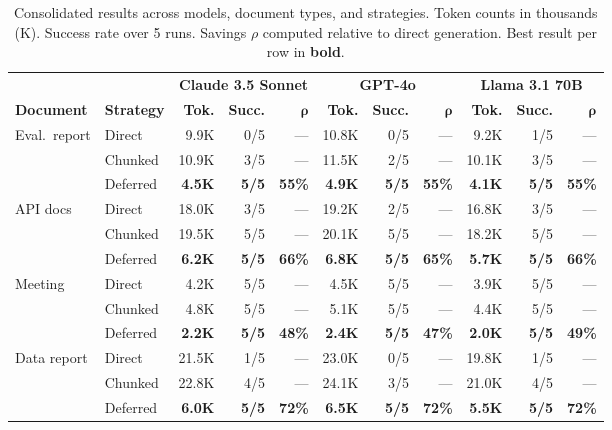 \documentclass[11pt,twocolumn]{article}
\begin{document}
\begin{table}[t]
\centering
\caption{Consolidated results across models, document types, and strategies.  Token counts in thousands (K).
Success rate over 5 runs.  Savings $\rho$ computed relative to direct generation.  Best result per row in \textbf{bold}.}
\label{tab:summary}
\small
\setlength{\tabcolsep}{4pt}
\begin{tabular}{@{}ll rrr rrr rrr@{}}
\toprule
& & \multicolumn{3}{c}{\textbf{Claude 3.5 Sonnet}} & \multicolumn{3}{c}{\textbf{GPT-4o}} & \multicolumn{3}{c}{\textbf{Llama 3.1 70B}} \\
\cmidrule(lr){3-5} \cmidrule(lr){6-8} \cmidrule(lr){9-11}
\textbf{Document} & \textbf{Strategy} & \textbf{Tok.} & \textbf{Succ.} & $\boldsymbol{\rho}$ & \textbf{Tok.} & \textbf{Succ.} & $\boldsymbol{\rho}$ & \textbf{Tok.} & \textbf{Succ.} & $\boldsymbol{\rho}$ \\
\midrule
\multirow{3}{*}{Eval.\ report}
  & Direct  & 9.9K  & 0/5 & ---  & 10.8K & 0/5 & ---  & 9.2K  & 1/5 & --- \\
  & Chunked & 10.9K & 3/5 & ---  & 11.5K & 2/5 & ---  & 10.1K & 3/5 & --- \\
  & Deferred& \textbf{4.5K}  & \textbf{5/5} & \textbf{55\%} & \textbf{4.9K}  & \textbf{5/5} & \textbf{55\%} & \textbf{4.1K}  & \textbf{5/5} & \textbf{55\%} \\
\midrule
\multirow{3}{*}{API docs}
  & Direct  & 18.0K & 3/5 & ---  & 19.2K & 2/5 & ---  & 16.8K & 3/5 & --- \\
  & Chunked & 19.5K & 5/5 & ---  & 20.1K & 5/5 & ---  & 18.2K & 5/5 & --- \\
  & Deferred& \textbf{6.2K}  & \textbf{5/5} & \textbf{66\%} & \textbf{6.8K}  & \textbf{5/5} & \textbf{65\%} & \textbf{5.7K}  & \textbf{5/5} & \textbf{66\%} \\
\midrule
\multirow{3}{*}{Meeting}
  & Direct  & 4.2K  & 5/5 & ---  & 4.5K  & 5/5 & ---  & 3.9K  & 5/5 & --- \\
  & Chunked & 4.8K  & 5/5 & ---  & 5.1K  & 5/5 & ---  & 4.4K  & 5/5 & --- \\
  & Deferred& \textbf{2.2K}  & \textbf{5/5} & \textbf{48\%} & \textbf{2.4K}  & \textbf{5/5} & \textbf{47\%} & \textbf{2.0K}  & \textbf{5/5} & \textbf{49\%} \\
\midrule
\multirow{3}{*}{Data report}
  & Direct  & 21.5K & 1/5 & ---  & 23.0K & 0/5 & ---  & 19.8K & 1/5 & --- \\
  & Chunked & 22.8K & 4/5 & ---  & 24.1K & 3/5 & ---  & 21.0K & 4/5 & --- \\
  & Deferred& \textbf{6.0K}  & \textbf{5/5} & \textbf{72\%} & \textbf{6.5K}  & \textbf{5/5} & \textbf{72\%} & \textbf{5.5K}  & \textbf{5/5} & \textbf{72\%} \\
\bottomrule
\end{tabular}
\end{table}
\end{document}
